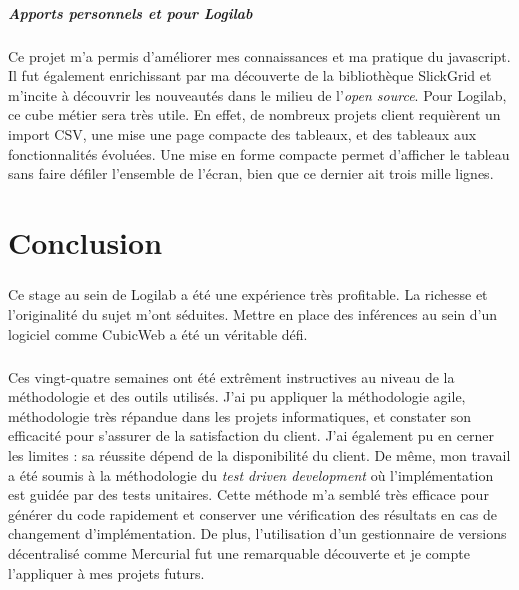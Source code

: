 \documentclass {report}
\begin{document}
\begin{lstlisting}[caption= code à insérer]
\end{lstlisting}


\paragraph{Apports personnels et pour Logilab}
Ce projet m'a permis d'améliorer mes connaissances et ma pratique du javascript\footnotemark[1]. Il fut également enrichissant par ma découverte de la bibliothèque SlickGrid et m'incite à découvrir les nouveautés dans le milieu de l'\textit{open source}. Pour Logilab, ce cube métier sera très utile. En effet, de nombreux projets client requièrent un import CSV, une mise une page compacte des tableaux, et des tableaux aux fonctionnalités évoluées. Une mise en forme compacte permet d'afficher le tableau sans faire défiler l'ensemble de l'écran, bien que ce dernier ait trois mille lignes.



\chapter{Conclusion}
\paragraph{}
Ce stage au sein de Logilab a été une expérience très profitable. La richesse et l'originalité du sujet m'ont séduites. Mettre en place des inférences au sein d'un logiciel comme CubicWeb a été un véritable défi. 

\paragraph{}
Ces vingt-quatre semaines ont été extrêment instructives au niveau de la méthodologie et des outils utilisés. J'ai pu appliquer la méthodologie agile, méthodologie très répandue dans les projets informatiques, et constater son efficacité pour s'assurer de la satisfaction du client. J'ai également pu en cerner les limites : sa réussite dépend de la disponibilité du client. De même, mon travail a été soumis à la méthodologie du \textit{test driven development} où l'implémentation est guidée par des tests unitaires. Cette méthode m'a semblé très efficace pour générer du code rapidement et conserver une vérification des résultats en cas de changement d'implémentation. De plus, l'utilisation d'un gestionnaire de versions décentralisé comme Mercurial fut une remarquable découverte et je compte l'appliquer à mes projets futurs.
\end{document}
